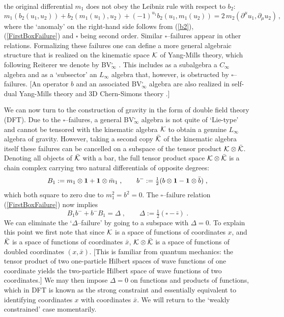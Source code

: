 \documentclass[12pt]{article}\pdfoutput=1
\def\B{\square}
\def\be{\begin{equation}}
\def\ee{\end{equation}}
\begin{document}
the original differential $m_1$ does not obey the Leibniz rule with respect to $b_2$: 
 \be
  m_1(b_2(u_1,u_2)) + b_2(m_1(u_1), u_2) + (-1)^{u_1} b_2(u_1,m_1(u_2)) =  2\, m_2(\partial^{\mu} u_1, \partial_{\mu} u_2) \,, 
 \ee
where the `anomaly' on the right-hand side follows from (\ref{b2}), (\ref{FirstBoxFailure}) and 
 $\B$ being second order.   
Similar $\B$--failures appear in other relations. Formalizing these failures one can define a more general algebraic structure 
that is realized on the kinematic space ${\cal K}$ of Yang-Mills theory, which following Reiterer 
we denote by  BV$_{\infty}^{\B}$ \cite{Reiterer:2019dys}. 
This  includes as a subalgebra a $C_{\infty}$ algebra and as a `subsector' an $L_{\infty}$ algebra that, however, is 
obstructed by $\B$--failures. [An operator $b$ and an associated  BV$_{\infty}^{\B}$ algebra are also realized 
in self-dual Yang-Mills theory \cite{Bonezzi:2023pox} 
and 3D Chern-Simons theory \cite{Bonezzi:2022bse,Ben-Shahar:2021zww,Borsten:2022vtg}.] 


We can now  turn to the construction of gravity in the form of double field theory (DFT). 
Due to the  $\B$--failures, a general BV$_{\infty}^{\B}$ algebra is not quite of `Lie-type' and 
cannot be tensored with the kinematic algebra ${\cal K}$ to obtain a genuine $L_{\infty}$ algebra of gravity. 
However, taking a second copy $\bar{\cal K}$ of the kinematic algebra itself these failures can be cancelled 
on a subspace of the tensor product ${\cal K}\otimes \bar{{\cal K}}$. Denoting all objects of  $\bar{\cal K}$ 
with a bar, the full tensor product space ${\cal K}\otimes \bar{{\cal K}}$ 
is a chain complex carrying two natural differentials of opposite degrees:  
 \be
  B_1:= m_1\otimes {\bf 1} +{\bf 1}\otimes \bar{m}_1\;, \qquad
  b^{-} := \tfrac{1}{2}(b\otimes {\bf 1} -  {\bf 1}\otimes \bar{b})\;, 
 \ee 
which both square to zero due to $m_1^2=b^2=0$. 
The $\B$--failure relation (\ref{FirstBoxFailure})  now implies 
 \be
  B_1 b^- + b^- B_1 = \Delta \;, \qquad \Delta := \tfrac{1}{2} (\B-\bar{\B})\;. 
 \ee 
We can eliminate  the  `$\Delta$--failure'  by going to a subspace with $\Delta=0$. To explain this point we first  note that 
since ${\cal K}$ is a space of functions of coordinates $x$, and $\bar{\cal K}$ is a space of functions 
of  coordinates $\bar{x}$, 
${\cal K}\otimes \bar{\cal K}$ is a space  of functions of doubled coordinates $(x,\bar{x})$. [This is familiar 
from quantum mechanics: the tensor product of two one-particle Hilbert spaces of wave functions of one coordinate 
yields the two-particle Hilbert space of wave functions of two coordinates.] 
We may then impose $\Delta=0$  on functions and products of functions, which in DFT is known as the 
strong constraint and essentially equivalent to identifying 
coordinates $x$ with coordinates $\bar{x}$. 
We will return to the `weakly constrained'  case momentarily. 
\end{document}
